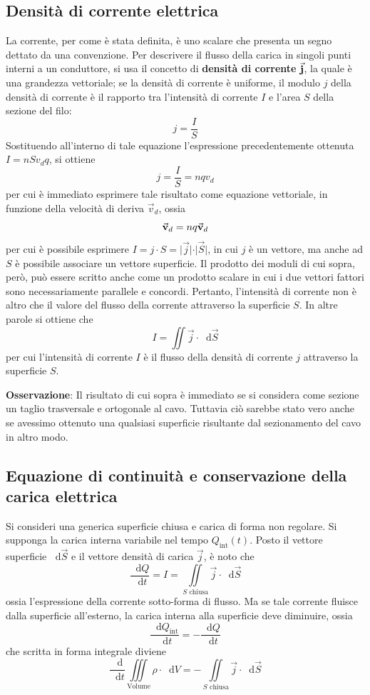 \documentclass[a4paper]{extarticle}
\newcommand\dif{\mathop{}\!\mathrm{d}}
\begin{document}
\subsection{Densità di corrente elettrica}
La corrente, per come è stata definita, è uno scalare che presenta un segno dettato da una convenzione. Per descrivere il flusso della carica in singoli punti interni a un conduttore, si usa il concetto di \textbf{densità di corrente} $\va{j}$, la quale è una grandezza vettoriale; se la densità di corrente è uniforme, il modulo $j$ della densità di corrente è il rapporto tra l'intensità di corrente $I$ e l'area $S$ della sezione del filo:
\[\boxed{j = \dfrac{I}{S}}\]
Sostituendo all'interno di tale equazione l'espressione precedentemente ottenuta $I=n S v_d q$, si ottiene
\[j = \dfrac{I}{S} = n q v_d\]
per cui è immediato esprimere tale risultato come equazione vettoriale, in funzione della velocità di deriva $\vec{v}_d$, ossia
\[\va{v}_d = n q \va{v}_d\]
per cui è possibile esprimere $I=j \cdot S = \vert \vec j \vert \cdot \vert \vec S \vert$, in cui $j$ è un vettore, ma anche ad $S$ è possibile associare un vettore superficie. Il prodotto dei moduli di cui sopra, però, può essere scritto anche come un prodotto scalare in cui i due vettori fattori sono necessariamente parallele e concordi. Pertanto, l'intensità di corrente non è altro che il valore del flusso della corrente attraverso la superficie $S$. In altre parole si ottiene che
\[\boxed{I=\iint \vec j \cdot \dif \vec S}\]
per cui l'intensità di corrente $I$ è il flusso della densità di corrente $j$ attraverso la superficie $S$.

\vspace{1em}
\noindent
\textbf{Osservazione}: Il risultato di cui sopra è immediato se si considera come sezione un taglio trasversale e ortogonale al cavo. Tuttavia ciò sarebbe stato vero anche se avessimo ottenuto una qualsiasi superficie risultante dal sezionamento del cavo in altro modo.

\vspace{1em}
\noindent
\subsection{Equazione di continuità e conservazione della carica elettrica}
Si consideri una generica superficie chiusa e carica di forma non regolare. Si supponga la carica interna variabile nel tempo $Q_\text{int}(t)$. Posto il vettore superficie $\dif \vec S$ e il vettore densità di carica $\vec j$, è noto che
\[\dfrac{\dif Q}{\dif t} = I = \underset{S \text{ chiusa}}{\iint} \vec j \cdot \dif \vec S\]
ossia l'espressione della corrente sotto-forma di flusso. Ma se tale corrente fluisce dalla superficie all'esterno, la carica interna alla superficie deve diminuire, ossia
\[\dfrac{\dif Q_\text{int}}{\dif t} = - \dfrac{\dif Q}{\dif t}\]
che scritta in forma integrale diviene
\[\dfrac{\dif }{\dif t} \underset{\text{Volume}}{\iiint} \rho \cdot \dif V = - \underset{S \text{ chiusa}}{\iint} \vec j \cdot \dif \vec S\]
\end{document}
